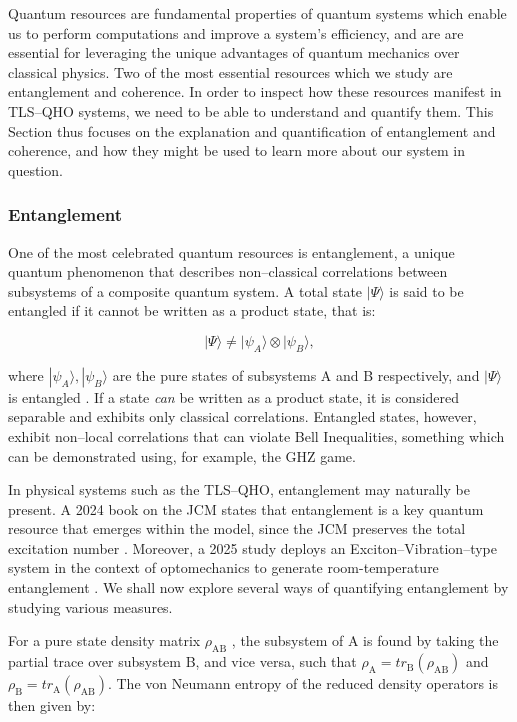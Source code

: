 \documentclass[11pt]{article}
\newcounter{subsubsubsection}[subsubsection]
\begin{document}
Quantum resources are fundamental properties of quantum systems which enable us to perform computations and improve a system's efficiency, and are are essential for leveraging the unique advantages of quantum mechanics over classical physics. Two of the most essential resources which we study are entanglement and coherence. In order to inspect how these resources manifest in TLS--QHO systems, we need to be able to understand and quantify them. This Section thus focuses on the explanation and quantification of entanglement and coherence, and how they might be used to learn more about our system in question. 

\subsubsection{Entanglement}

One of the most celebrated quantum resources is entanglement, a unique quantum phenomenon that describes non--classical correlations between subsystems of a composite quantum system. A total state $|\Psi\rangle$ is said to be entangled if it cannot be written as a product state, that is:

\begin{equation}
    |\Psi\rangle \neq |\psi_A\rangle \otimes |\psi_B\rangle,
\end{equation}

where $|\psi_A\rangle, |\psi_B\rangle$ are the pure states of subsystems A and B respectively, and $|\Psi\rangle$ is entangled \cite{Entanglement1999-Overview_&REE}. If a state \textit{can} be written as a product state, it is considered separable and exhibits only classical correlations. Entangled states, however, exhibit non--local correlations that can violate Bell Inequalities, something which can be demonstrated using, for example, the GHZ game. 

In physical systems such as the TLS--QHO, entanglement may  naturally be present. A 2024 book on the JCM states that entanglement is a key quantum resource that emerges within the model, since the JCM preserves the total excitation number \cite{General2024-JC_overview}. Moreover, a 2025 study deploys an Exciton--Vibration--type system in the context of optomechanics to generate room-temperature entanglement \cite{Entanglement2025-ExVib_roomtemp}. We shall now explore several ways of quantifying entanglement by studying various measures.


For a pure state density matrix $\rho_{\scriptscriptstyle \text{AB}}$ \cite{Entanglement1999-Overview_&REE}, the subsystem of A is  found by taking the partial trace over subsystem B, and vice versa, such that $\rho_{\scriptscriptstyle \text{A}} = tr_{\scriptscriptstyle \text{B}}(\rho_{\scriptscriptstyle \text{AB}})$ and $\rho_{\scriptscriptstyle \text{B}} = tr_{\scriptscriptstyle \text{A}}(\rho_{\scriptscriptstyle \text{AB}})$. The von Neumann entropy of the reduced density operators is then given by:
\end{document}
